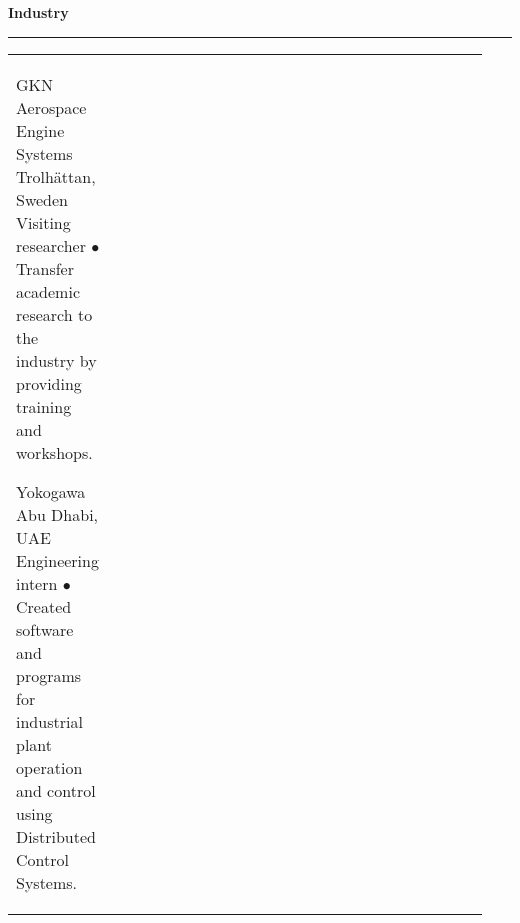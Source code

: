 \documentclass[10pt]{article} %
\begin{document}

\vspace{-\baselineskip}\medskip %


\textbf{\large Industry}\medskip \hrule \medskip


\begin{supertabular}{>{\raggedleft\arraybackslash}p{0.17\linewidth}p{0.6\linewidth}>{\raggedleft\arraybackslash}p{0.17\linewidth}} %


	{} %
	{GKN Aerospace Engine Systems} %
	{Trolh\"{a}ttan, Sweden} %
	{Visiting researcher} %
	{$\bullet$ Transfer academic research to the industry by providing training and workshops.}{} %


	{} %
	{Yokogawa} %
	{Abu Dhabi, UAE} %
	{Engineering intern} %
	{$\bullet$ Created software and programs for industrial plant operation and control using Distributed Control Systems.}{} %


\end{supertabular}


\vspace{-\baselineskip}\medskip %
\end{document}
